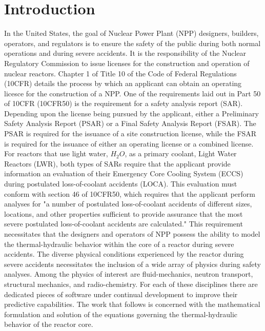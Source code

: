 \chapter{Introduction}
\label{chap:intro}
In the United States, the goal of Nuclear Power Plant (NPP) designers, builders, operators, and regulators is to ensure the safety of the public during both normal operations and during severe accidents.
It is the responsibility of the Nuclear Regulatory Commission to issue licenses for the construction and operation of nuclear reactors.
Chapter 1 of Title 10 of the Code of Federal Regulations (10CFR) details the process by which an applicant can obtain an operating licesce for the construction of a NPP.
One of the requirements laid out in Part 50 of 10CFR (10CFR50) is the requirement for a safety analysis report (SAR).
Depending upon the license being pursued by the applicant, either a Preliminary Safety Analysis Report (PSAR) or a Final Safety Analysis Report (FSAR).
The PSAR is required for the issuance of a site construction license, while the FSAR is required for the issuance of either an operating license or a combined license.
For reactors that use light water, $H_2 O$, as a primary coolant, Light Water Reactors (LWR), both types of SARs require that the applicant provide information an evaluation of their Emergency Core Cooling System (ECCS) during postulated loss-of-coolant accidents (LOCA).
This evaluation must conform with section 46 of 10CFR50, which requires that the applicant perform analyses for "a number of postulated loss-of-coolant accidents of different sizes, locations, and other properties sufficient to provide assurance that the most severe postulated loss-of-coolant accidents are calculated."
This requirement necessitates that the designers and operators of NPP possess the ability to model the thermal-hydraulic behavior within the core of a reactor during severe accidents.  
The diverse physical conditions experienced by the reactor during severe accidents necessitates the inclusion of a wide array of physics during safety analyses.
Among the physics of interest are fluid-mechanics, neutron transport, structural mechanics, and radio-chemistry.
For each of these disciplines there are dedicated pieces of software under continual development to improve their predictive capabilities.
The work that follows is concerned with the mathematical formulation and solution of the equations governing the thermal-hydraulic behavior of the reactor core.

